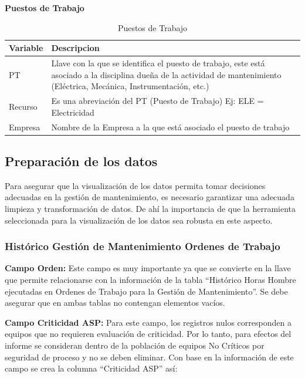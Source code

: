 \documentclass[
  11pt,
  bookmarksnumbered]{article}
\begin{document}
\textbf{Puestos de Trabajo}

\begin{table}[H]

\caption{\label{tab:unnamed-chunk-9}Puestos de Trabajo}
\centering
\fontsize{9}{11}\selectfont
\begin{tabular}[t]{l|>{\raggedright\arraybackslash}p{35em}}
\hline
Variable & Descripcion\\
\hline
PT & Llave con la que se identifica el puesto de trabajo, este está asociado a la disciplina dueña de la actividad de mantenimiento (Eléctrica, Mecánica, Instrumentación, etc.)\\
\hline
Recurso & Es una abreviación del PT (Puesto de Trabajo) Ej: ELE = Electricidad\\
\hline
Empresa & Nombre de la Empresa a la que está asociado el puesto de trabajo\\
\hline
\end{tabular}
\end{table}

\hypertarget{preparaciuxf3n-de-los-datos}{%
\subsection{Preparación de los datos}\label{preparaciuxf3n-de-los-datos}}

Para asegurar que la visualización de los datos permita tomar decisiones adecuadas en la gestión de mantenimiento, es necesario garantizar una adecuada limpieza y transformación de datos.
De ahí la importancia de que la herramienta seleccionada para la visualización de los datos sea robusta en este aspecto.

\hypertarget{histuxf3rico-gestiuxf3n-de-mantenimiento-ordenes-de-trabajo}{%
\subsubsection{Histórico Gestión de Mantenimiento Ordenes de Trabajo}\label{histuxf3rico-gestiuxf3n-de-mantenimiento-ordenes-de-trabajo}}

\textbf{Campo Orden:} Este campo es muy importante ya que se convierte en la llave que permite relacionarse con la información de la tabla ``Histórico Horas Hombre ejecutadas en Ordenes de Trabajo para la Gestión de Mantenimiento''.
Se debe asegurar que en ambas tablas no contengan elementos vacíos.

\textbf{Campo Criticidad ASP:} Para este campo, los registros nulos corresponden a equipos que no requieren evaluación de criticidad.
Por lo tanto, para efectos del informe se consideran dentro de la población de equipos No Críticos por seguridad de proceso y no se deben eliminar.
Con base en la información de este campo se crea la columna ``Criticidad ASP'' así:
\end{document}
